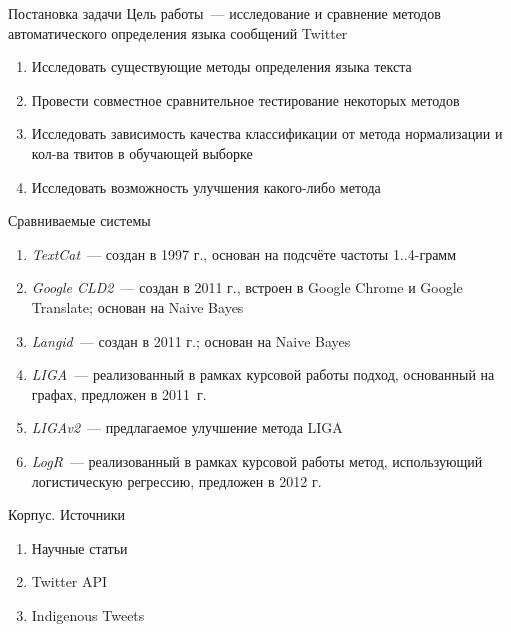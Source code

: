 \documentclass[mathserif,utf8,14pt]{beamer}
\begin{document}
\begin{frame}{Постановка задачи}
    Цель работы~--- исследование и сравнение методов автоматического определения языка сообщений Twitter
    \begin{enumerate}
        \item Исследовать существующие методы определения языка текста
        \item Провести совместное сравнительное тестирование некоторых методов
        \item Исследовать зависимость качества классификации от метода нормализации и кол-ва твитов в
            обучающей выборке
        \item Исследовать возможность улучшения какого-либо метода
    \end{enumerate}
\end{frame}

\begin{frame}{Сравниваемые системы}
    \begin{enumerate}
        \item \emph{TextCat}~--- создан в 1997 г., основан на подсчёте частоты 1..4-грамм
        \item \emph{Google CLD2}~--- создан в 2011 г., встроен в Google Chrome и Google Translate; основан на Naive Bayes
        \item \emph{Langid}~--- создан в 2011 г.; основан на Naive Bayes
        \item \emph{LIGA}~--- реализованный в рамках курсовой работы подход, основанный на графах, предложен в 2011~г.
        \item \emph{LIGAv2}~--- предлагаемое улучшение метода LIGA
        \item \emph{LogR}~--- реализованный в рамках курсовой работы метод, использующий логистическую регрессию, предложен в 2012 г.
    \end{enumerate}
\end{frame}

\begin{frame}{Корпус. Источники}
    \begin{enumerate}
        \item Научные статьи
        \item Twitter API
        \item Indigenous Tweets
    \end{enumerate}
\end{frame}
\end{document}
